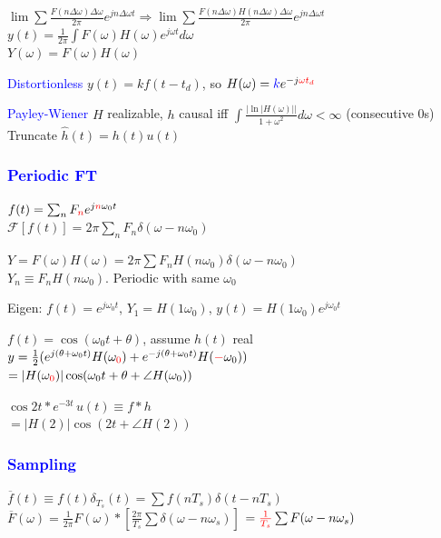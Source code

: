 \documentclass[4pt]{article}
\theoremstyle{definition}
\theoremstyle{definition}
\renewcommand{\o}{\omega}
\newcommand{\red}[1]{\textcolor{red}{#1}}
\newcommand{\blue}[1]{\textcolor{blue}{#1}}
\begin{document}
\begin{landscape}
\begin{multicols}{3}
    \(\lim\sum \frac{F(n\Delta\o)\Delta\o}{2\pi} e^{jn\Delta\o t}\Rightarrow \lim\sum \frac{F(n\Delta\o)H(n\Delta\o)\Delta\o}{2\pi} e^{jn\Delta\o t}\)\\
    \(y(t) = \frac{1}{2\pi}\int F(\o)H(\o)e^{j\o t} d\o\)\\
    \(Y(\o) = F(\o) H(\o)\)

    \blue{Distortionless} $y(t) = kf(t-t_d)$,
    so $H(\o) = \blue{k} e^{-j\red{\o t_d}}$        %

    \blue{Payley-Wiener} $H$ realizable, $h$ causal iff \(\int\frac{|\ln|H(\omega)||}{1+\o^2} d\o < \infty\) (consecutive 0s)\\
        \hspace{1em} Truncate \(\hat{h}(t) = h(t) u(t)\)

\subsubsection*{\blue{Periodic FT}}
    \(f(t) = \sum_n F_{\red n} e^{j \red{n} \o_0 t}\)\\
    \(\mathcal{F}[f(t)] = 2\pi \sum_n F_n \delta(\omega - n\o_0)\)     

    \(Y = F(\omega)H(\omega) = 2\pi \sum F_n H(n\omega_0) \delta(\omega - n\omega_0) \) \\            %
    $Y_n \equiv F_n H(n\o_0)$. Periodic with same $\omega_0$

    Eigen: $f(t) = e^{j\o_0t}$, \(Y_1 = H(1\o_0)\), $y(t) = H(1\o_0) e^{j\o_0 t}$

    $f(t) = \cos(\o_0 t + \theta)$, assume $h(t)$ real\\
        \hspace{1em} \(y = \frac 1 2 (e^{j(\theta + \o_0 t)}H(\o_{\red 0}) + e^{-j(\theta + \o_0 t)}H(\red{-} \o_0))\)\\
            \hspace{2em} \(=|H(\o_{\red 0})| \cos(\o_0t + \theta + \angle H(\o_0))\)

    \(\cos 2t * e^{-3t}\, u(t) \equiv f * h\)\\ 
        \hspace{1em} \(=|H(2)| \cos(2t + \angle H(2))\)              %
\columnbreak
\subsubsection*{\blue{Sampling}}
    \(\overline{f}(t)\equiv f(t) \delta_{T_s}(t) = \sum f(nT_s) \delta(t - nT_s)\)\\
    \(\overline{F}(\o) = \frac{1}{2\pi} F(\o) * [\frac{2\pi}{T_s} \sum\delta(\o - n\o_s)]\)
    \(= \red{\frac{1}{T_s}}\sum F(\o - n\o_s)\)


\end{multicols}
\end{landscape}
\end{document}
